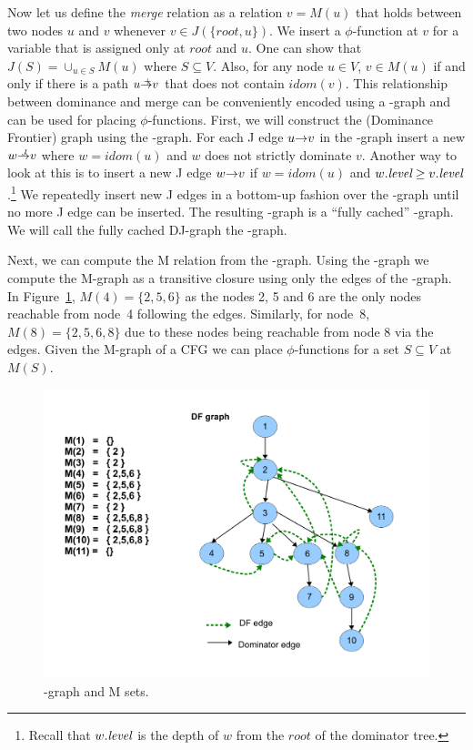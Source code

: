 {Now let us define the {\em merge} relation as a relation 
$v=M(u)$ that holds between two nodes $u$ and $v$ whenever
$v \in J(\{\textit{root}, u\})$. We insert a $\phi$-function at $v$ for a variable that is assigned
only at $\textit{root}$ and $u$. One can show that $J(S) = \cup_{u \in S} M(u)$ where $S \subseteq V$. Also, for any node $u \in V$, $v \in M(u)$ if and only if
there is a path $u \stplus v$ that does not contain $\textit{idom}(v)$.  This relationship between
dominance and merge can be conveniently encoded using a \DJ-graph and can be used for placing 
$\phi$-functions. First, we will construct the \DF (Dominance Frontier) graph using the \DJ-graph. For each J edge $u \st{} v$ in the \DJ-graph insert a new  $w \st{J} v$ where
$w = \textit{idom} (u)$ and $w$ does not strictly dominate $v$. Another way to look at 
this is to insert a new J edge $w \st{} v$ if $w = \textit{idom}(u)$ and $w.\textit{level} \geq 
v.\textit{level}$.\footnote{Recall that $w.\textit{level}$ is the depth of $w$ from the
$\textit{root}$ of the dominator tree.} We repeatedly insert new J edges in a bottom-up fashion over the \DJ-graph until no more J edge can be inserted. The resulting \DJ-graph is a ``fully cached'' \DJ-graph. We will call the fully cached DJ-graph the \DF-graph.

Next, we can compute the M relation from the \DF-graph. 
Using the \DF-graph we compute the M-graph as a transitive closure
using only the \DF edges of the \DJ-graph. In Figure~\ref{fig:mgraph}, $M(4) = 
\{2,5,6\}$ as the nodes 2, 5 and 6 are the only nodes reachable from node~4 
following the \DF edges. Similarly, for node~8, $M(8) = \{2,5,6,8\}$ due to these nodes being reachable from node 8 via the \DF edges. Given the M-graph of a CFG we can place $\phi$-functions for a set $S \subseteq V$ at $M(S)$.

    \begin{figure}[htb]
    \centerline{\includegraphics[scale=0.4]{mgraph_1.pdf}}
    \caption{\DF-graph and M sets.}
    \label{fig:mgraph}
    \end{figure} 

}
